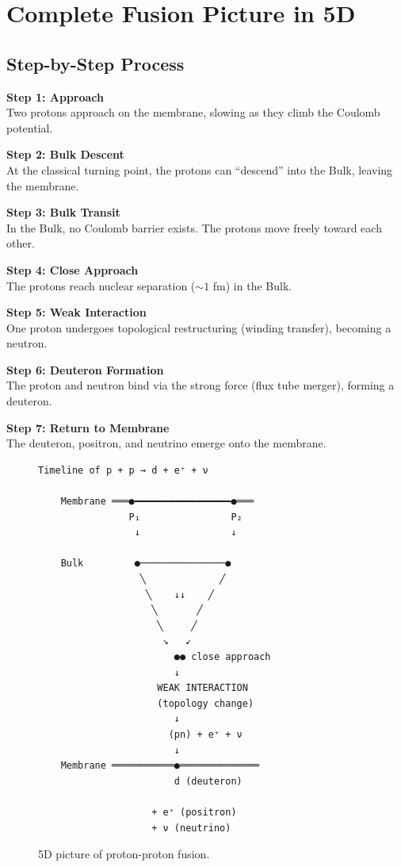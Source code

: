\documentclass[12pt,a4paper]{article}
\begin{document}
\section{Complete Fusion Picture in 5D}

\subsection{Step-by-Step Process}

\textbf{Step 1: Approach}\\
Two protons approach on the membrane, slowing as they climb the Coulomb potential.

\textbf{Step 2: Bulk Descent}\\
At the classical turning point, the protons can ``descend'' into the Bulk, leaving the membrane.

\textbf{Step 3: Bulk Transit}\\
In the Bulk, no Coulomb barrier exists. The protons move freely toward each other.

\textbf{Step 4: Close Approach}\\
The protons reach nuclear separation ($\sim 1$ fm) in the Bulk.

\textbf{Step 5: Weak Interaction}\\
One proton undergoes topological restructuring (winding transfer), becoming a neutron.

\textbf{Step 6: Deuteron Formation}\\
The proton and neutron bind via the strong force (flux tube merger), forming a deuteron.

\textbf{Step 7: Return to Membrane}\\
The deuteron, positron, and neutrino emerge onto the membrane.

\begin{figure}[H]
\centering
\begin{verbatim}
Timeline of p + p → d + e⁺ + ν

    Membrane ═══●━━━━━━━━━━━━━━━━━●═══
                P₁                P₂
                 ↓                ↓
    
    Bulk         ●───────────────●
                  ╲             ╱
                   ╲    ↓↓    ╱
                    ╲       ╱
                     ╲     ╱
                      ↘   ↙
                        ●● close approach
                        ↓
                     WEAK INTERACTION
                     (topology change)
                        ↓
                       (pn) + e⁺ + ν
                        ↓
    Membrane ═══════════●══════════════
                        d (deuteron)
                        
                    + e⁺ (positron)
                    + ν (neutrino)
\end{verbatim}
\caption{5D picture of proton-proton fusion.}
\end{figure}
\end{document}
